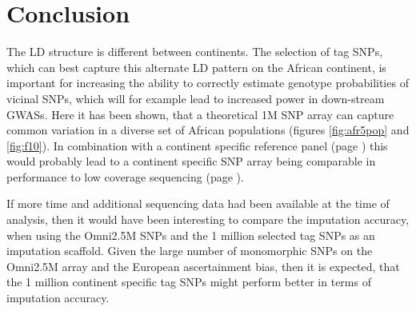 \section{Conclusion}

The \gls{LD} structure is different between continents. The selection of tag \glspl{SNP}, which can best capture this alternate \gls{LD} pattern on the African continent, is important for increasing the ability to correctly estimate genotype probabilities of vicinal SNPs, which will for example lead to increased power in down-stream \glspl{GWAS}. Here it has been shown, that a theoretical 1M SNP array can capture common variation in a diverse set of African populations (figures \ref{fig:afr5pop} and \ref{fig:f10}). In combination with a continent specific reference panel (page \pageref{ch:reference_panel}) this would probably lead to a continent specific SNP array being comparable in performance to low coverage sequencing (page \pageref{ch:downsampling}).

If more time and additional sequencing data had been available at the time of analysis, then it would have been interesting to compare the imputation accuracy, when using the Omni2.5M SNPs and the 1 million selected tag SNPs as an imputation scaffold. Given the large number of monomorphic SNPs on the Omni2.5M array and the European ascertainment bias, then it is expected, that the 1 million continent specific tag SNPs might perform better in terms of imputation accuracy.

